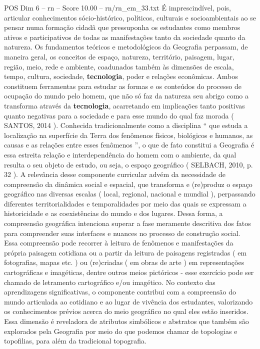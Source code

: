 \begin{textsample}{POS Dim 6 – rn – Score 10.00 – rn/rn\_em\_33.txt}
É imprescindível, pois, articular conhecimentos sócio-histórico, políticos, culturais e socioambientais ao se pensar numa formação cidadã que pressuponha os estudantes como membros ativos e participativos de todas as manifestações tanto da sociedade quanto da natureza.
Os fundamentos teóricos e metodológicos da Geografia perpassam, de maneira geral, os conceitos de espaço, natureza, território, paisagem, lugar, região, meio, rede e ambiente, coadunados também às dimensões de escala, tempo, cultura, sociedade, \textbf{tecnologia}, poder e relações econômicas.
Ambos constituem ferramentas para estudar as formas e os conteúdos do processo de ocupação do mundo pelo homem, que não só faz da natureza seu abrigo como a transforma através da \textbf{tecnologia}, acarretando em implicações tanto positivas quanto negativas para a sociedade e para esse mundo do qual faz morada ( SANTOS, 2014 ).
Conhecida tradicionalmente como a disciplina “ que estuda a localização na superfície da Terra dos fenômenos físicos, biológicos e humanos, as causas e as relações entre esses fenômenos ”, o que de fato constitui a Geografia é essa estreita relação e interdependência do homem com o ambiente, da qual resulta o seu objeto de estudo, ou seja, o espaço geográfico ( SELBACH, 2010, p. 32 ).
A relevância desse componente curricular advém da necessidade de compreensão da dinâmica social e espacial, que transforma e (re)produz o espaço geográfico nas diversas escalas ( local, regional, nacional e mundial ), perpassando diferentes territorialidades e temporalidades por meio das quais se expressam a historicidade e as coexistências do mundo e dos lugares.
Dessa forma, a compreensão geográfica intenciona superar a fase meramente descritiva dos fatos para compreender suas interfaces e nuances no processo de construção social.
Essa compreensão pode recorrer à leitura de fenômenos e manifestações da própria paisagem cotidiana ou a partir da leitura de paisagens registradas ( em fotografias, mapas etc. ) ou (re)criadas ( em obras de arte ) em representações cartográficas e imagéticas, dentre outros meios pictóricos - esse exercício pode ser chamado de letramento cartográfico e/ou imagético.
No contexto das aprendizagens significativas, o componente contribui com a compreensão do mundo articulada ao cotidiano e ao lugar de vivência dos estudantes, valorizando os conhecimentos prévios acerca do meio geográfico no qual eles estão inseridos.
Essa dimensão é reveladora de atributos simbólicos e abstratos que também são explorados pela Geografia por meio do que podemos chamar de topologias e topofilias, para além da tradicional topografia.

\end{textsample}
